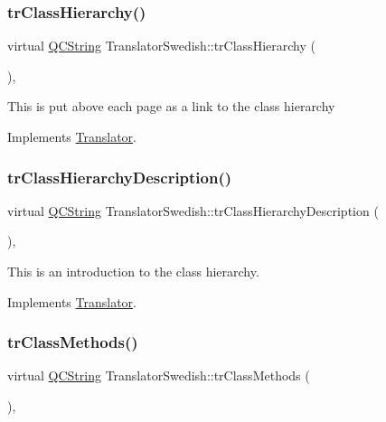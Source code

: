 \subsubsection{\texorpdfstring{trClassHierarchy()}{trClassHierarchy()}}
{\footnotesize\ttfamily virtual \mbox{\hyperlink{class_q_c_string}{Q\+C\+String}} Translator\+Swedish\+::tr\+Class\+Hierarchy (\begin{DoxyParamCaption}{ }\end{DoxyParamCaption})\hspace{0.3cm}{\ttfamily [inline]}, {\ttfamily [virtual]}}

This is put above each page as a link to the class hierarchy 

Implements \mbox{\hyperlink{class_translator}{Translator}}.

\mbox{\label{class_translator_swedish_a702bf5c0a4dc5237d5712fdc80824b2d}} 
\subsubsection{\texorpdfstring{trClassHierarchyDescription()}{trClassHierarchyDescription()}}
{\footnotesize\ttfamily virtual \mbox{\hyperlink{class_q_c_string}{Q\+C\+String}} Translator\+Swedish\+::tr\+Class\+Hierarchy\+Description (\begin{DoxyParamCaption}{ }\end{DoxyParamCaption})\hspace{0.3cm}{\ttfamily [inline]}, {\ttfamily [virtual]}}

This is an introduction to the class hierarchy. 

Implements \mbox{\hyperlink{class_translator}{Translator}}.

\mbox{\label{class_translator_swedish_ae40510f560884da536d5abcc7791a687}} 
\subsubsection{\texorpdfstring{trClassMethods()}{trClassMethods()}}
{\footnotesize\ttfamily virtual \mbox{\hyperlink{class_q_c_string}{Q\+C\+String}} Translator\+Swedish\+::tr\+Class\+Methods (\begin{DoxyParamCaption}{ }\end{DoxyParamCaption})\hspace{0.3cm}{\ttfamily [inline]}, {\ttfamily [virtual]}}

